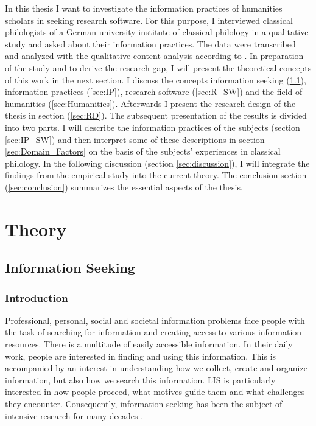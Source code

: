 \documentclass[12pt, a4paper, titlepage, oneside, abstract=true, toc=listof, toc=bibliography, BCOR=1cm]{scrreprt}
\begin{document}
In this thesis I want to investigate the information practices of humanities scholars in seeking research software. For this purpose, I interviewed classical philologists of a German university institute of classical philology in a qualitative study and asked about their information practices. The data were transcribed and analyzed with the qualitative content analysis according to \citet{Mayring2014}. In preparation of the study and to derive the research gap, I will present the theoretical concepts of this work in the next section. I discuss the concepts information seeking (\ref{sec:IS}), information practices (\ref{sec:IP}), research software (\ref{sec:R_SW}) and the field of humanities (\ref{sec:Humanities}). Afterwards I present the research design of the thesis in section (\ref{sec:RD}). The subsequent presentation of the results is divided into two parts. I will describe the information practices of the subjects (section \ref{sec:IP_SW}) and then interpret some of these descriptions in section \ref{sec:Domain_Factors} on the basis of the subjects' experiences in classical philology. In the following discussion (section \ref{sec:discussion}), I will integrate the findings from the empirical study into the current theory. The conclusion section (\ref{sec:conclusion}) summarizes the essential aspects of the thesis.

\chapter{Theory}

\section{Information Seeking}
\label{sec:IS}

\subsection{Introduction}
Professional, personal, social and societal information problems face people with the task of searching for information and creating access to various information resources. There is a multitude of easily accessible information. In their daily work, people are interested in finding and using this information. This is accompanied by an interest in understanding how we collect, create and organize information, but also how we search this information. \gls{LIS} is particularly interested in how people proceed, what motives guide them and what challenges they encounter. Consequently, information seeking has been the subject of intensive research for many decades \citep[p. 55ff]{Ingwersen2005}. 
\end{document}

